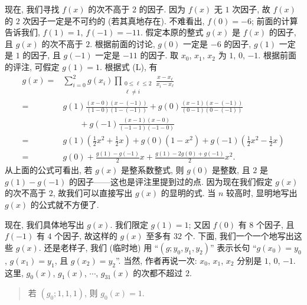 \begin{example}
    现在, 我们寻找 $f(x)$ 的次不高于 $2$ 的因子. 因为 $f(x)$ 无 $1$ 次因子, 故 $f(x)$ 的 $2$ 次因子一定是不可约的 (若其真地存在). 不难看出, $f(0) = -6$; 前面的计算告诉我们, $f(1) = 1$, $f(-1) = -11$. 假定本原的整式 $g(x)$ 是 $f(x)$ 的因子, 且 $g(x)$ 的次不高于 $2$. 根据前面的讨论, $g(0)$ 一定是 $-6$ 的因子, $g(1)$ 一定是 $1$ 的因子, 且 $g(-1)$ 一定是 $-11$ 的因子. 取 $x_0$, $x_1$, $x_2$ 为 $1$, $0$, $-1$. 根据前面的评注, 可假定 $g(1) = 1$. 根据式 (L), 有
    \begin{align*}
        g(x)
        = {} & \sum_{i = 0}^{2} g(x_i) \prod_{\begin{smallmatrix}0 \leq \ell \leq 2 \\\ell \neq i\end{smallmatrix}} \frac{x - x_\ell}{x_i - x_\ell}                            \\
        = {} & g(1) \frac{(x-0)(x-(-1))}{(1-0)(1-(-1))} + g(0) \frac{(x-1)(x-(-1))}{(0-1)(0-(-1))}                                   \\
             & \qquad + g(-1) \frac{(x-1)(x-0)}{(-1-1)(-1-0)}                                                                        \\
        = {} & g(1) \left( \frac{1}{2}x^2 + \frac{1}{2}x \right) + g(0) (1-x^2) + g(-1) \left( \frac{1}{2}x^2 - \frac{1}{2}x \right) \\
        = {} & g(0) + \frac{g(1) - g(-1)}{2} x + \frac{g(1) - 2g(0) + g(-1)}{2} x^2.
    \end{align*}
    从上面的公式可看出, 若 $g(x)$ 是整系数整式, 则 $g(0)$ 是整数, 且 $2$ 是 $g(1) - g(-1)$ 的因子——这也是评注里提到过的点. 因为现在我们假定 $g(x)$ 的次不高于 $2$, 故我们可以直接写出 $g(x)$ 的显明的式. 当 $n$ 较高时, 显明地写出 $g(x)$ 的公式就不方便了.

    现在, 我们具体地写出 $g(x)$. 我们限定 $g(1) = 1$; 又因 $f(0)$ 有 $8$ 个因子, 且 $f(-1)$ 有 $4$ 个因子, 故这样的 $g(x)$ 至多有 $32$ 个. 下面, 我们一个一个地写出这些 $g(x)$. 还是老样子, 我们 (临时地) 用 ``$(g; y_0, y_1, y_2)$'' 表示长句 ``$g(x_0) = y_0$, $g(x_1) = y_1$, 且 $g(x_2) = y_2$''. 当然, 作者再说一次: $x_0$, $x_1$, $x_2$ 分别是 $1$, $0$, $-1$. 这里, $g_0 (x)$, $g_1 (x)$, $\cdots$, $g_{31} (x)$ 的次都不超过 $2$.

    \begin{quotation}
        若 $(g_0; 1, 1, 1)$, 则 $g_0 (x) = 1$.


\end{quotation}
\end{example}
